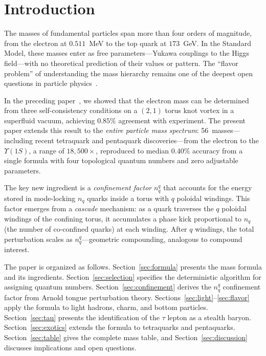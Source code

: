 \documentclass[11pt,a4paper]{article}
\begin{document}
\tableofcontents


\section{Introduction}
\label{sec:intro}

The masses of fundamental particles span more than four orders of
magnitude, from the electron at $0.511$~MeV to the top quark at
$173$~GeV.  In the Standard Model, these masses enter as free
parameters---Yukawa couplings to the Higgs field---with no
theoretical prediction of their values or pattern.  The ``flavor
problem'' of understanding the mass hierarchy remains one of the
deepest open questions in particle physics~\cite{PDG}.

In the preceding paper~\cite{paper5}, we showed that the electron
mass can be determined from three self-consistency conditions on a
$(2,1)$ torus knot vortex in a superfluid vacuum, achieving $0.85\%$
agreement with experiment.  The present paper extends this result to
the \emph{entire particle mass spectrum}: 56~masses---including
recent tetraquark and pentaquark discoveries---from the electron to
the $\Upsilon(1S)$, a range of $18{,}500\times$, reproduced to
median $0.40\%$ accuracy from a single formula with four topological
quantum numbers and zero adjustable parameters.

The key new ingredient is a \emph{confinement factor} $n_q^q$ that
accounts for the energy stored in mode-locking $n_q$ quarks inside
a torus with $q$ poloidal windings.  This factor emerges from a
\emph{cascade} mechanism: as a quark traverses the $q$ poloidal
windings of the confining torus, it accumulates a phase kick
proportional to $n_q$ (the number of co-confined quarks) at each
winding.  After $q$ windings, the total perturbation scales as
$n_q^q$---geometric compounding, analogous to compound interest.

The paper is organized as follows.  Section~\ref{sec:formula}
presents the mass formula and its ingredients.
Section~\ref{sec:selection} specifies the deterministic algorithm
for assigning quantum numbers.
Section~\ref{sec:confinement} derives the $n_q^q$ confinement factor
from Arnold tongue perturbation theory.
Sections~\ref{sec:light}--\ref{sec:flavor} apply the formula to
light hadrons, charm, and bottom particles.
Section~\ref{sec:tau} presents the identification of the $\tau$
lepton as a stealth baryon.  Section~\ref{sec:exotics} extends the
formula to tetraquarks and pentaquarks.
Section~\ref{sec:table} gives the complete mass table, and
Section~\ref{sec:discussion} discusses implications and open
questions.
\end{document}
